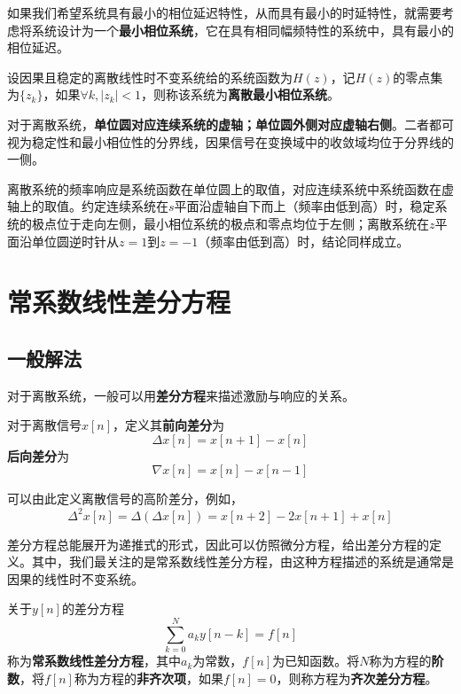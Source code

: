 \documentclass{ctexbook}
\begin{document}
如果我们希望系统具有最小的相位延迟特性，从而具有最小的时延特性，就需要考虑将系统设计为一个\textbf{最小相位系统}，它在具有相同幅频特性的系统中，具有最小的相位延迟。
\begin{definition}[离散最小相位系统]
    设因果且稳定的离散线性时不变系统给的系统函数为$H(z)$，记$H(z)$的零点集为$\{z_k\}$，如果$\forall k,|z_k|<1$，则称该系统为\textbf{离散最小相位系统}。
\end{definition} 

对于离散系统，\textbf{单位圆对应连续系统的虚轴；单位圆外侧对应虚轴右侧}。二者都可视为稳定性和最小相位性的分界线，因果信号在变换域中的收敛域均位于分界线的一侧。

离散系统的频率响应是系统函数在单位圆上的取值，对应连续系统中系统函数在虚轴上的取值。约定连续系统在$s$平面沿虚轴自下而上（频率由低到高）时，稳定系统的极点位于走向左侧，最小相位系统的极点和零点均位于左侧；离散系统在$z$平面沿单位圆逆时针从$z=1$到$z=-1$（频率由低到高）时，结论同样成立。

\section{常系数线性差分方程}

\subsection{一般解法}\label{sub:difference_equation}

对于离散系统，一般可以用\textbf{差分方程}来描述激励与响应的关系。

\begin{definition}[差分]
    对于离散信号$x[n]$，定义其\textbf{前向差分}为
    $$\Delta x[n]=x[n+1]-x[n]$$
    \textbf{后向差分}为
    $$\nabla x[n]=x[n]-x[n-1]$$
\end{definition}

可以由此定义离散信号的高阶差分，例如，
$$\Delta^2 x[n]=\Delta(\Delta x[n])=x[n+2]-2x[n+1]+x[n]$$

差分方程总能展开为递推式的形式，因此可以仿照微分方程，给出差分方程的定义。其中，我们最关注的是常系数线性差分方程，由这种方程描述的系统是通常是因果的线性时不变系统。
\begin{definition}[常系数线性差分方程]
    关于$y[n]$的差分方程
    $$\sum_{k=0}^{N}a_k y[n-k] = f[n]$$
    称为\textbf{常系数线性差分方程}，其中$a_k$为常数，$f[n]$为已知函数。将$N$称为方程的\textbf{阶数}，将$f[n]$称为方程的\textbf{非齐次项}，如果$f[n]=0$，则称方程为\textbf{齐次差分方程}。
\end{definition}
\end{document}
